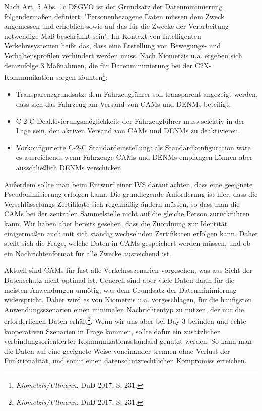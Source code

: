 Nach Art. 5 Abs. 1c DSGVO ist der Grundsatz der Datenminimierung folgendermaßen definiert: "Personenbezogene Daten müssen dem Zweck angemessen und erheblich sowie auf das für die Zwecke der Verarbeitung notwendige Maß beschränkt sein". Im Kontext von Intelligenten Verkehrssystemen heißt das, dass eine Erstellung von Bewegungs- und Verhaltensprofilen verhindert werden muss. Nach Kiometzis u.a. \nocite{Kiometzis2017}ergeben sich demzufolge 3 Maßnahmen, die für Datenminimierung bei der C2X-Kommunikation sorgen könnten\footnote{\emph{Kiometzis/Ullmann}, DuD 2017, S. 231.}:
\begin{itemize}
	\item Transparenzgrundsatz: dem Fahrzeugführer soll transparent angezeigt werden, dass sich das Fahrzeug am Versand von CAMs und DENMs beteiligt. 
	\item C-2-C Deaktivierungsmöglichkeit: der Fahrzeugführer muss selektiv in der Lage sein, den aktiven Versand von CAMs und DENMs zu deaktivieren.
	\item Vorkonfigurierte C-2-C Standardeinstellung: als Standardkonfiguration wäre es ausreichend, wenn Fahrzeuge CAMs und DENMs empfangen können aber ausschließlich DENMs verschicken
\end{itemize}

Außerdem sollte man beim Entwurf einer IVS darauf achten, dass eine geeignete Pseudonimisierung erfolgen kann. Die grundlegende Anforderung ist hier, dass die Verschlüsselungs-Zertifikate sich regelmäßig ändern müssen, so dass man die CAMs bei der zentralen Sammelstelle nicht auf die gleiche Person zurückführen kann. Wir haben aber bereits gesehen, dass die Zuordnung zur Identität einigermaßen auch mit sich ständig wechselnden Zertifikaten erfolgen kann. Daher stellt sich die Frage, welche Daten in CAMs gespeichert werden müssen, und ob ein Nachrichtenformat für alle Zwecke ausreichend ist.

Aktuell sind CAMs für fast alle Verkehrsszenarien vorgesehen, was aus Sicht der Datenschutz nicht optimal ist. Generell sind aber viele Daten darin für die meisten Anwendungen unnötig, was dem Grundsatz der Datenminimierung widerspricht. Daher wird es von Kiometzis u.a. vorgeschlagen, für die häufigsten Anwendungsszenarien einen minimalen Nachrichtentyp zu nutzen, der nur die erforderlichen Daten erhält\footnote{\emph{Kiometzis/Ullmann}, DuD 2017, S. 231.}. Wenn wir uns aber bei Day 3 befinden und echte kooperativen Szenarien in Frage kommen, sollte dafür ein zusätzlicher verbindungsorientierter Kommunikationsstandard genutzt werden. So kann man die Daten auf eine geeignete Weise voneinander trennen ohne Verlust der Funktionalität, und somit einen datenschutzrechtlichen Kompromiss erreichen.


